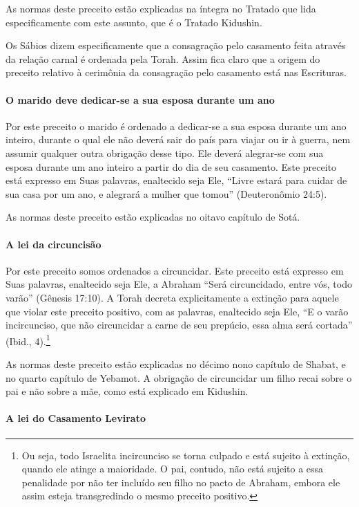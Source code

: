 As normas deste preceito estão explicadas na íntegra no Tratado que lida
especificamente com este assunto, que é o Tratado Kidushin.

Os Sábios dizem especificamente que a consagração pelo casamento feita
através da relação carnal é ordenada pela Torah. Assim fica claro que a
origem do preceito relativo à cerimônia da consagração pelo casamento está
nas Escrituras.

\paragraph{O marido deve dedicar-se a sua esposa durante um ano}

Por este preceito o marido é ordenado a dedicar-se a sua esposa durante
um ano inteiro, durante o qual ele não deverá sair do país para viajar
ou ir à guerra, nem assumir qualquer outra obrigação desse tipo. Ele
deverá alegrar-se com sua esposa durante um ano inteiro a partir do dia
de seu casamento. Este preceito está expresso em Suas palavras,
enaltecido seja Ele, ``Livre estará para cuidar de sua casa por um ano,
e alegrará a mulher que tomou'' (Deuteronômio 24:5).

As normas deste preceito estão explicadas no oitavo capítulo de Sotá.

\paragraph{A lei da circuncisão}

Por este preceito somos ordenados a circuncidar. Este preceito está
expresso em Suas palavras, enaltecido seja Ele, a Abraham ``Será
circuncidado, entre vós, todo varão'' (Gênesis 17:10). A Torah decreta
explicitamente a extinção para aquele que violar este preceito
positivo, com as palavras, enaltecido seja Ele, ``E o varão
incircunciso, que não circuncidar a carne de seu prepúcio, essa alma
será cortada'' (Ibid., 4).\footnote{Ou seja, todo Israelita incircunciso se torna culpado e está
sujeito à extinção, quando ele atinge a maioridade. O pai, contudo, não
está sujeito a essa penalidade por não ter incluído seu filho no pacto
de Abraham, embora ele assim esteja transgredindo o mesmo preceito
positivo.}

As normas deste preceito estão explicadas no décimo nono capítulo de
Shabat, e no quarto capítulo de Yebamot. A obrigação de circuncidar um
filho recai sobre o pai e não sobre a mãe, como está explicado em
Kidushin.

\paragraph{A lei do Casamento Levirato}

